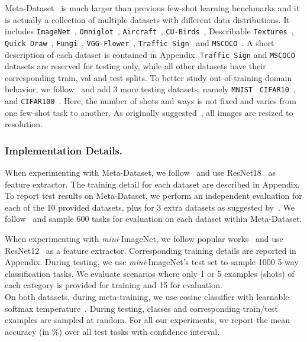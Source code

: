 \documentclass[runningheads]{llncs}
\begin{document}
Meta-Dataset~\cite{triantafillou2019meta} is much larger than previous few-shot
learning benchmarks and it is actually a collection of multiple
datasets with different data distributions.
It includes 
\texttt{ImageNet}~\cite{imagenet}, \texttt{Omniglot}~\cite{lake2015human},
\texttt{Aircraft}~\cite{maji13fine-grained},
\texttt{CU-Birds}~\cite{wah2011caltech}, Describable
\texttt{Textures}~\cite{cimpoi2014describing}, \texttt{Quick
Draw}~\cite{quickdraw}, \texttt{Fungi}~\cite{fungi},
\texttt{VGG-Flower}~\cite{nilsback2008automated}, \texttt{Traffic
Sign}~\cite{houben2013detection} and \texttt{MSCOCO}~\cite{coco}. A short
description of each dataset is contained in Appendix.
\texttt{Traffic Sign} and \texttt{MSCOCO} datasets are reserved for testing
only, while all other datasets have their corresponding train, val and test
splits. To better study out-of-training-domain behavior, we
follow~\cite{requeima2019fast} and add 3 more testing datasets, namely
\texttt{MNIST}~\cite{mnist} \texttt{CIFAR10}~\cite{krizhevsky2009learning}, and
\texttt{CIFAR100}~\cite{krizhevsky2009learning}. Here, the number of shots and
ways is not fixed and varies from one few-shot task to another. As originally
suggested~\cite{triantafillou2019meta}, all images are
resized to  resolution.

\subsubsection{Implementation Details.}
When experimenting with Meta-Dataset, we
follow~\cite{requeima2019fast} and use ResNet18~\cite{resnet} as feature
extractor. The training detail for each dataset are described in Appendix.
To report test results on Meta-Dataset, we perform an independent evaluation
for each of the 10 provided datasets, plus for 3 extra datasets as suggested
by~\cite{requeima2019fast}. We follow~\cite{triantafillou2019meta} and sample
600 tasks for evaluation on each dataset within Meta-Dataset.

When experimenting with \textit{mini}-ImageNet, we follow popular
works~\cite{gidaris2019boosting,lifchitz2019dense,oreshkin2018tadam} and use
ResNet12~\cite{oreshkin2018tadam} as a feature extractor. Corresponding training
details are reported in Appendix. During testing, we use
\textit{mini}-ImageNet's test set to sample 1000 5-way classification tasks. We
evaluate scenarios where only 1 or 5 examples (shots) of each category is
provided for training and 15 for evaluation.
\\
On both datasets, during meta-training, we use cosine classifier with learnable
softmax temperature~\cite{chen19closerfewshot}. During testing, classes and
corresponding train/test examples are sampled at random. For all our
experiments, we report the mean accuracy (in \%) over all test tasks with  confidence interval.
\end{document}

